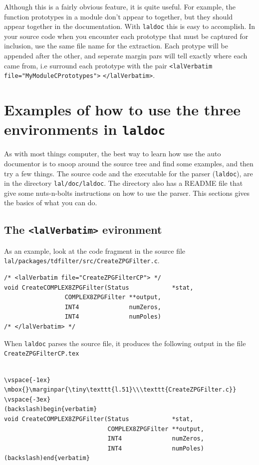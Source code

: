 \documentclass[oneside]{book}
\begin{document}
{{{{Although this is a fairly obvious feature, it is quite useful.  For
example, the function prototypes in a module don't appear to together,
but they should appear together in the documentation.  With {\texttt
{laldoc}} this is easy to accomplish. In your source code when you
encounter each prototype that must be captured for inclusion, use the
same file name for the extraction. Each protype will be appended after
the other, and seperate margin pars will tell exactly where each came
from, i.e surround each prototype with the pair
{\tt <lalVerbatim file="MyModuleCPrototypes">} {\tt </lalVerbatim>}.





\section{Examples of how to use the three environments in {\texttt {laldoc}} }

As with most things computer, the best way to learn how use the auto
documentor is to snoop around the source tree and find some examples,
and then try a few things.  The source code and the executable for the
parser ({\tt laldoc}), are in the directory {\tt lal/doc/laldoc}.  The
directory also has a README file that give some nuts-n-bolts
instructions on how to use the parser.  This sections gives the basics
of what you can do.


\subsection{The {\texttt {<lalVerbatim>} }  evironment }

As an example, look at the code fragment in the source file 
\texttt{lal/packages/tdfilter/src/CreateZPGFilter.c}.

\begin{verbatim}
/* <lalVerbatim file="CreateZPGFilterCP"> */
void CreateCOMPLEX8ZPGFilter(Status            *stat,
			     COMPLEX8ZPGFilter **output,
			     INT4              numZeros,
			     INT4              numPoles)
/* </lalVerbatim> */
\end{verbatim}
When {\tt laldoc} parses the source file, it produces the following
output in the file {\tt CreateZPGFilterCP.tex}

\begin{verbatim}

\vspace{-1ex}
\mbox{}\marginpar{\tiny\texttt{l.51}\\\texttt{CreateZPGFilter.c}}
\vspace{-3ex}
(backslash)begin{verbatim}
void CreateCOMPLEX8ZPGFilter(Status            *stat,
                             COMPLEX8ZPGFilter **output,
                             INT4              numZeros,
                             INT4              numPoles)
(backslash)end{verbatim}
\end{verbatim}

}}}}
\end{document}

